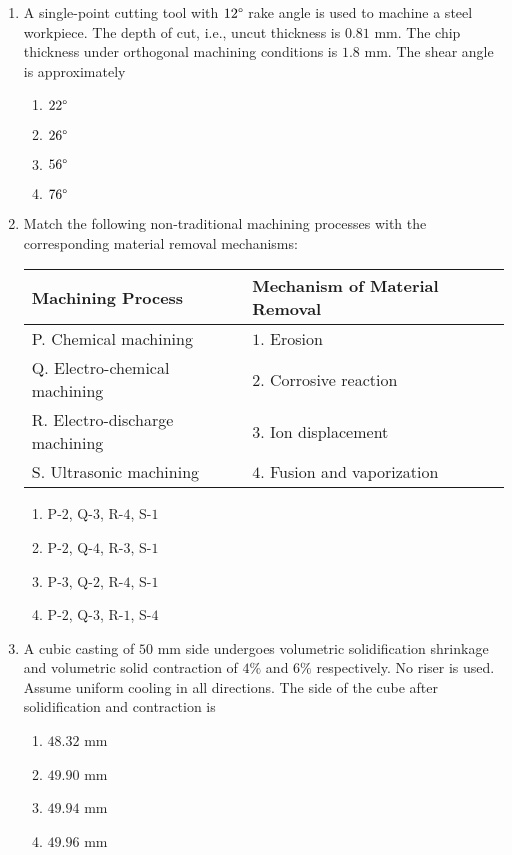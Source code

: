 \documentclass[journal,12pt,twocolumn]{IEEEtran}
\theoremstyle{remark}
\begin{document}
\begin{enumerate}[start=40]
    \item A single-point cutting tool with $12\degree$ rake angle is used to machine a steel workpiece. The depth of cut, i.e., uncut thickness is $0.81$ mm. The chip thickness under orthogonal machining conditions is $1.8$ mm. The shear angle is approximately
    \begin{enumerate}
        \item $22\degree$
        \item $26\degree$
        \item $56\degree$
        \item $76\degree$
    \end{enumerate}

    \item Match the following non-traditional machining processes with the corresponding material removal mechanisms:
    \begin{center}
        \begin{center}
    \begin{tabular}{|p{3cm}|p{3cm}|}
        \hline
        \textbf{Machining Process} & \textbf{Mechanism of Material Removal} \\
        \hline
        P. Chemical machining & $1.$ Erosion \\
        Q. Electro-chemical machining & $2.$ Corrosive reaction \\
        R. Electro-discharge machining & $3.$ Ion displacement \\
        S. Ultrasonic machining & $4.$ Fusion and vaporization \\
        \hline
    \end{tabular}
\end{center}

    \end{center}
    \begin{enumerate}
        \item P-$2$, Q-$3$, R-$4$, S-$1$
        \item P-$2$, Q-$4$, R-$3$, S-$1$
        \item P-$3$, Q-$2$, R-$4$, S-$1$
        \item P-$2$, Q-$3$, R-$1$, S-$4$
    \end{enumerate}

    \item A cubic casting of $50$ mm side undergoes volumetric solidification shrinkage and volumetric solid contraction of $4\%$ and $6\%$ respectively. No riser is used. Assume uniform cooling in all directions. The side of the cube after solidification and contraction is
    \begin{enumerate}
        \item $48.32$ mm
        \item $49.90$ mm
        \item $49.94$ mm
        \item $49.96$ mm
    \end{enumerate}




\end{enumerate}
\end{document}
